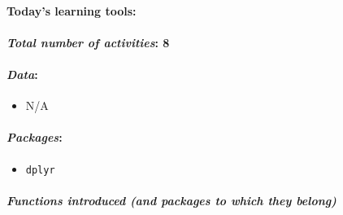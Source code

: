 \documentclass[
]{book}
\providecommand{\tightlist}{%
  \setlength{\itemsep}{0pt}\setlength{\parskip}{0pt}}
\begin{document}
\hypertarget{todays-learning-tools}{%
\paragraph*{\texorpdfstring{\textbf{Today's learning tools}:}{Today's learning tools:}}\label{todays-learning-tools}}

\hypertarget{total-number-of-activities-8}{%
\paragraph*{\texorpdfstring{\emph{Total number of activities}: 8}{Total number of activities: 8}}\label{total-number-of-activities-8}}

\hypertarget{data}{%
\paragraph*{\texorpdfstring{\emph{Data}:}{Data:}}\label{data}}

\begin{itemize}
\tightlist
\item
  N/A
\end{itemize}

\hypertarget{packages}{%
\paragraph*{\texorpdfstring{\emph{Packages}:}{Packages:}}\label{packages}}

\begin{itemize}
\tightlist
\item
  \texttt{dplyr}
\end{itemize}

\hypertarget{functions-introduced-and-packages-to-which-they-belong}{%
\paragraph*{\texorpdfstring{\emph{Functions introduced (and packages to which they belong)}}{Functions introduced (and packages to which they belong)}}\label{functions-introduced-and-packages-to-which-they-belong}}
\end{document}
